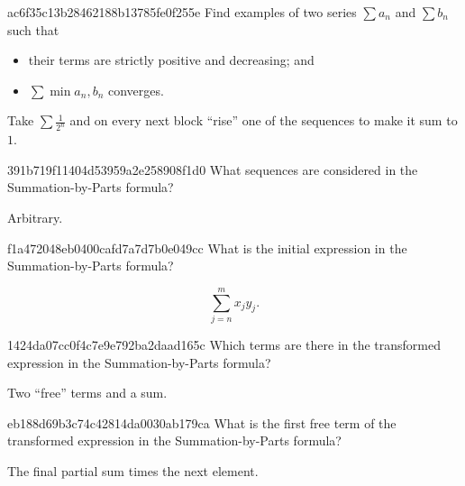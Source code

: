 \begin{note}{ac6f35c13b28462188b13785fe0f255e}
    Find examples of two series \({ \sum a_n }\) and \({ \sum b_n }\) such that
    \begin{itemize}
        \item their terms are strictly positive and decreasing; and
        \item \({ \sum \min{a_n, b_n} }\) converges.
    \end{itemize}

    \begin{cloze}{1}
        Take \({ \sum \frac{1}{2^{n}} }\) and on every next block ``rise'' one of the sequences to make it sum to \({ 1 }\).
    \end{cloze}
\end{note}

\begin{note}{391b719f11404d53959a2e258908f1d0}
    What sequences are considered in the Summation-by-Parts formula?

    \begin{cloze}{1}
        Arbitrary.
    \end{cloze}
\end{note}

\begin{note}{f1a472048eb0400cafd7a7d7b0e049cc}
    What is the initial expression in the Summation-by-Parts formula?

    \begin{cloze}{1}
        \[
            \sum_{j=n}^{m} x_j y_j.
        \]
    \end{cloze}
\end{note}

\begin{note}{1424da07cc0f4c7e9e792ba2daad165c}
    Which terms are there in the transformed expression in the Summation-by-Parts formula?

    \begin{cloze}{1}
        Two ``free'' terms and a sum.
    \end{cloze}
\end{note}

\begin{note}{eb188d69b3c74c42814da0030ab179ca}
    What is the first free term of the transformed expression in the Summation-by-Parts formula?

    \begin{cloze}{1}
        The final partial sum times the next element.
    \end{cloze}
\end{note}

